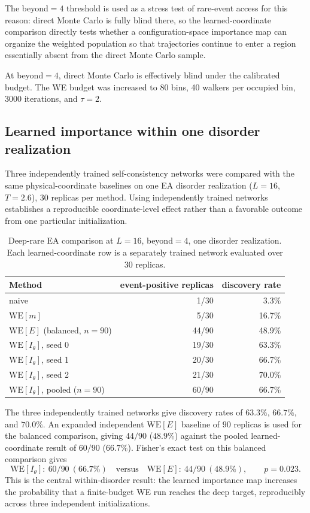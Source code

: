 \documentclass[a4paper,fleqn]{cas-sc}
\newcommand{\WE}{\mathrm{WE}}
\begin{document}
The beyond$=4$ threshold is used as a stress test of rare-event access for this reason: direct
Monte Carlo is fully blind there, so the learned-coordinate comparison directly tests whether a
configuration-space importance map can organize the weighted population so that trajectories
continue to enter a region essentially absent from the direct Monte Carlo sample.

\FloatBarrier

At beyond$=4$, direct Monte Carlo is effectively blind under the calibrated budget. The WE
budget was increased to 80 bins, 40 walkers per occupied bin, 3000 iterations, and $\tau=2$.

\subsection{Learned importance within one disorder realization}\label{sec:deep}\label{sec:deepwithin}
Three independently trained self-consistency networks were compared with the same
physical-coordinate baselines on one EA disorder realization ($L=16$, $T=2.6$), $30$ replicas
per method. Using independently trained networks establishes a reproducible coordinate-level
effect rather than a favorable outcome from one particular initialization.

\begin{table}[H]
\centering\small
\caption{Deep-rare EA comparison at $L=16$, beyond$=4$, one disorder realization. Each
learned-coordinate row is a separately trained network evaluated over 30 replicas.}
\label{tab:deep}
\begin{tabular}{lrr}
\toprule
Method & event-positive replicas & discovery rate \\
\midrule
naive & 1/30 & 3.3\% \\
$\WE[m]$ & 5/30 & 16.7\% \\
$\WE[E]$ (balanced, $n=90$) & 44/90 & 48.9\% \\
$\WE[I_\theta]$, seed 0 & 19/30 & 63.3\% \\
$\WE[I_\theta]$, seed 1 & 20/30 & 66.7\% \\
$\WE[I_\theta]$, seed 2 & 21/30 & 70.0\% \\
$\WE[I_\theta]$, pooled ($n=90$) & 60/90 & 66.7\% \\
\bottomrule
\end{tabular}
\end{table}

The three independently trained networks give discovery rates of $63.3\%$, $66.7\%$, and
$70.0\%$. An expanded independent $\WE[E]$ baseline of $90$ replicas is used for the balanced
comparison, giving $44/90$ ($48.9\%$) against the pooled learned-coordinate result of $60/90$
($66.7\%$). Fisher's exact test on this balanced comparison gives
\begin{equation}
\WE[I_\theta]:\ 60/90\ (66.7\%)\quad\text{versus}\quad\WE[E]:\ 44/90\ (48.9\%),\qquad p=0.023.
\label{eq:withinp}
\end{equation}
This is the central within-disorder result: the learned importance map increases
the probability that a finite-budget WE run reaches the deep target, reproducibly across three
independent initializations.
\end{document}
